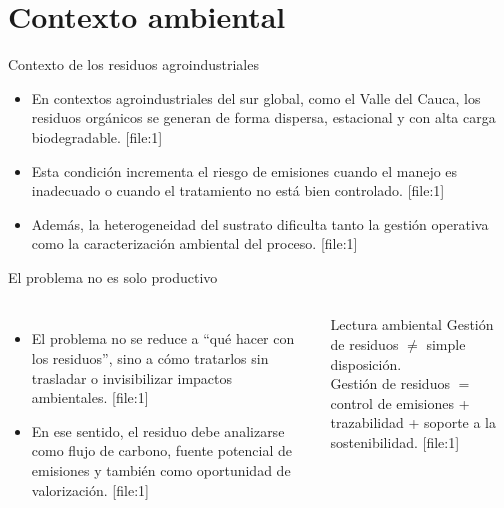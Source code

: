 \documentclass[10pt,aspectratio=169]{beamer}
\newcommand{\basecite}{\hfill{\color{griscita}\tiny [file:1]}}
\begin{document}
\section{Contexto ambiental}

\begin{frame}{Contexto de los residuos agroindustriales}
\justifying
\begin{itemize}
    \item En contextos agroindustriales del sur global, como el Valle del Cauca, los residuos orgánicos se generan de forma dispersa, estacional y con alta carga biodegradable. \basecite
    \item Esta condición incrementa el riesgo de emisiones cuando el manejo es inadecuado o cuando el tratamiento no está bien controlado. \basecite
    \item Además, la heterogeneidad del sustrato dificulta tanto la gestión operativa como la caracterización ambiental del proceso. \basecite
\end{itemize}
\end{frame}

\begin{frame}{El problema no es solo productivo}
\justifying
\begin{columns}[T]
\begin{itemize}
    \item El problema no se reduce a “qué hacer con los residuos”, sino a cómo tratarlos sin trasladar o invisibilizar impactos ambientales. \basecite
    \item En ese sentido, el residuo debe analizarse como flujo de carbono, fuente potencial de emisiones y también como oportunidad de valorización. \basecite
\end{itemize}

\begin{block}{Lectura ambiental}
Gestión de residuos \(\neq\) simple disposición.\\[0.3em]
Gestión de residuos \(=\) control de emisiones + trazabilidad + soporte a la sostenibilidad. \basecite
\end{block}
\end{columns}
\end{frame}
\end{document}
